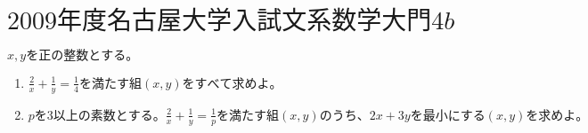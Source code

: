 \documentclass{jsarticle}
\begin{document}
\section*{{\bf $ 2009年度　名古屋大学入試文系数学 大門4b $}}
$ x,yを正の整数とする。$
\begin{enumerate}[(1)]
\item $\frac{2}{x} + \frac{1}{y} = \frac{1}{4}　を満たす組(x,y)をすべて求めよ。$
\item $pを3以上の素数とする。\frac{2}{x} + \frac{1}{y} = \frac{1}{p} を満たす組(x,y)のうち、2x+3yを最小にする(x,y)を求めよ。$
\end{enumerate}


\end{document}
